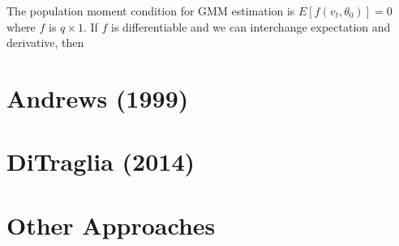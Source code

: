 \documentclass[12pt]{article}
\theoremstyle{definition}
\begin{document}
The population moment condition for GMM estimation is $E[f(v_t, \theta_0)]=0$ where $f$ is $q\times 1$. If $f$ is differentiable and we can interchange expectation and derivative, then


\section{Andrews (1999)}

\section{DiTraglia (2014)}

\section{Other Approaches}
\end{document}
